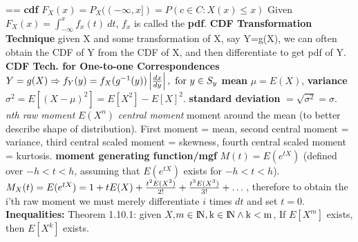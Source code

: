 \setbox\bigbox=\vbox{\hsize=\strutA{\splittopskip}{0pt}%
%
\piflong{}%
%
%
%
%
{\bf cdf} $F_X(x) = P_X((-\infty,x])=P({c\in C : X(x)\le x})$\quad
Given $F_X(x) = \int_{-\infty}^xf_x(t)\ dt$, $f_x$ is called the {\bf pdf}.\quad
{\bf CDF Transformation Technique} given X and some transformation of X, say Y=g(X), we can often obtain the CDF of Y from the CDF of X, and then differentiate to get pdf of Y.\quad
{\bf CDF Tech. for One-to-one Correspondences} $Y=g(X) \Rightarrow f_Y(y) = f_X(g^{-1}(y)) \left|{dx \over dy}\right|,\ {\rm for}\ y \in S_y$\quad
{\bf mean} $\mu = E(X)$, {\bf variance} $\sigma^2=E[(X-\mu)^2]=E[X^2]-E[X]^2$. {\bf standard deviation } $=\sqrt{\sigma^2}=\sigma$.
{\it nth raw moment} $E(X^n)$ {\it central moment} moment around the mean (to better describe shape of distribution).
First moment = mean, second central moment = variance, third central scaled moment = skewness, fourth central scaled moment = kurtosis.
{\bf moment generating function/mgf } $M(t)=E(e^{tX})$ (defined over $-h < t < h$, assuming that $E(e^{tX})$ exists for $-h < t < h$).
$M_X(t)=E(e^{tX})=1+tE(X)+{t^2E(X^2) \over 2!} + {t^3E(X^3) \over 3!} + \dots$, therefore to obtain the i'th raw moment we must merely differentiate $i$ times $dt$ and set $t=0$.
{\bf Inequalities:} Theorem 1.10.1: given $X$,$m \in \rm I\!N, k \in \rm I\!N \land k < m$, If $E[X^m]$ exists, then $E[X^k]$ exists.\quad
}
